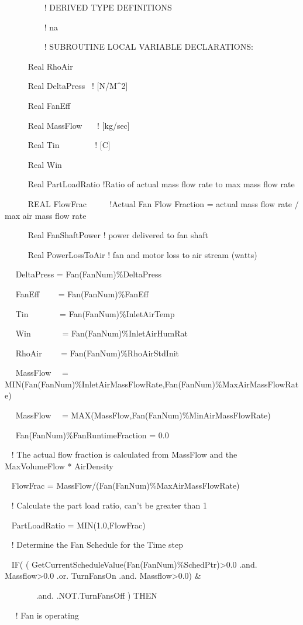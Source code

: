 ~~~~~~~~~ ! DERIVED TYPE DEFINITIONS

~~~~~~~~~ ! na

~~~~~~~~~ ! SUBROUTINE LOCAL VARIABLE DECLARATIONS:

~~~~~ Real RhoAir

~~~~~ Real DeltaPress~ ! {[}N/M\^{}2{]}

~~~~~ Real FanEff

~~~~~ Real MassFlow~~~ ! {[}kg/sec{]}

~~~~~ Real Tin~~~~~~~~ ! {[}C{]}

~~~~~ Real Win

~~~~~ Real PartLoadRatio !Ratio of actual mass flow rate to max mass flow rate

~~~~~ REAL FlowFrac~~~~~ !Actual Fan Flow Fraction = actual mass flow rate / max air mass flow rate

~~~~~ Real FanShaftPower ! power delivered to fan shaft

~~~~~ Real PowerLossToAir ! fan and motor loss to air stream (watts)

~~ DeltaPress = Fan(FanNum)\%DeltaPress

~~ FanEff~~~~ = Fan(FanNum)\%FanEff

~~ Tin~~~~~~~ = Fan(FanNum)\%InletAirTemp

~~ Win~~~~~~~ = Fan(FanNum)\%InletAirHumRat

~~ RhoAir~~~~ = Fan(FanNum)\%RhoAirStdInit

~~ MassFlow~~ = MIN(Fan(FanNum)\%InletAirMassFlowRate,Fan(FanNum)\%MaxAirMassFlowRate)

~~ MassFlow~~ = MAX(MassFlow,Fan(FanNum)\%MinAirMassFlowRate)

~~ Fan(FanNum)\%FanRuntimeFraction = 0.0

~ ! The actual flow fraction is calculated from MassFlow and the MaxVolumeFlow * AirDensity

~ FlowFrac = MassFlow/(Fan(FanNum)\%MaxAirMassFlowRate)

~ ! Calculate the part load ratio, can't be greater than 1

~ PartLoadRatio = MIN(1.0,FlowFrac)

~ ! Determine the Fan Schedule for the Time step

~ IF( ( GetCurrentScheduleValue(Fan(FanNum)\%SchedPtr)\textgreater{}0.0 .and. Massflow\textgreater{}0.0 .or. TurnFansOn .and. Massflow\textgreater{}0.0) \&

~~~ ~~~~.and. .NOT.TurnFansOff ) THEN

~~ ! Fan is operating

